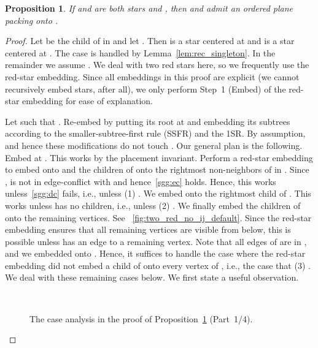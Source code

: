 \documentclass[11pt,a4paper,colorlinks=true,urlcolor=blue,citecolor=red]{article}
\theoremstyle{plain}
\newtheorem{proposition}[theorem]{Proposition}
\begin{document}
\begin{proposition}\label{prop:rec_large_red_star_ij_not_used_sp_star}
  If  and  are both stars and ,
  then  and  admit an ordered plane packing onto .
\end{proposition}
\begin{proof}
  Let  be the child of  in  and let . Then  is a
  star centered at  and  is a star centered at . The case
   is handled by Lemma~\ref{lem:rec_singleton}. In the remainder
  we assume .  We deal with two red stars here, so we
  frequently use the red-star embedding. Since all embeddings in this
  proof are explicit (we cannot recursively embed stars, after all), we
  only perform Step~1 (Embed) of the red-star embedding for ease of
  explanation.

  Let  such that . Re-embed  by putting
  its root at  and embedding its subtrees according to the
  smaller-subtree-first rule (SSFR) and the 1SR. By assumption,
   and hence these modifications do not touch
  . Our general plan is the following. Embed  at .
  This works by the placement invariant. Perform a red-star
  embedding to embed  onto  and the children of  onto the
  rightmost  non-neighbors of  in . Since
  ,  is not in edge-conflict with  and
  hence~\ref{sgg:ec} holds. Hence, this works unless~\ref{sgg:dc} fails,
  i.e., unless (1) . We
  embed  onto the rightmost child  of . This works unless 
  has no children, i.e., unless (2) . We finally embed the
  children of  onto the remaining vertices. See
  \figurename~\ref{fig:two_red_no_ij_default}. Since the
  red-star embedding ensures that all remaining vertices are
  visible from below, this is possible unless  has an edge to a
  remaining vertex. Note that all edges of  are in , and we
  embedded  onto . Hence, it suffices to handle the case where the
  red-star embedding did not embed a child of  onto every
  vertex of , i.e., the case that (3)
  . We deal with these remaining cases
  below. We first state a useful observation.

  \begin{figure}[b]
    \centering\hfil {}\hfil {}\hfil {}\\
    \hfil {}\hfil \label{fig:two_red_no_ij_1}
    \caption{The case analysis in the proof of
      Proposition~\ref{prop:rec_large_red_star_ij_not_used_sp_star}
      (Part~1/4).}
  \end{figure}



\end{proof}
\end{document}
